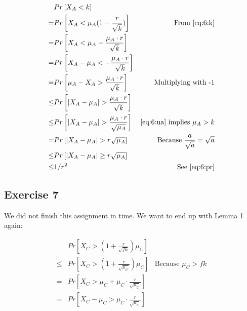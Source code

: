 \begin{align*}
	 & Pr\left[X_A < k\right] & \\
	=& Pr\left[X_A < \mu_A(1-\frac{r}{\sqrt{k}})\right] & \text{From \eqref{eq:6:k}} \\
	=& Pr\left[X_A < \mu_A - \frac{\mu_A \cdot r}{\sqrt{k}}\right] & \\
	=& Pr\left[X_A - \mu_A < -\frac{\mu_A \cdot r}{\sqrt{k}} \right] & \\
	=& Pr\left[\mu_A - X_A > \frac{\mu_A \cdot r}{\sqrt{k}} \right] & \text{Multiplying with -1} \\
	\leq & Pr\left[|X_A - \mu_A| > \frac{\mu_A \cdot r}{\sqrt{k}} \right] 
		& \\
	\leq & Pr\left[|X_A - \mu_A| > \frac{\mu_A \cdot r}{\sqrt{\mu_A}} \right]
		& \text{\eqref{eq:6:ua} implies $\mu_A > k$} \\
	=& Pr\left[|X_A - \mu_A| > r \sqrt{\mu_A} \right]
		& \text{Because $\frac{a}{\sqrt{a}} = \sqrt{a}$}\\
	\leq & Pr\left[|X_A - \mu_A| \geq r \sqrt{\mu_A} \right]
		& \\
	\leq & 1/r^2 & \text{See \eqref{eq:6:pr}}
\end{align*}

\subsection{Exercise 7}
We did not finish this assignment in time. We want to end up with Lemma 1 again:

\begin{align*}
	& Pr\left[ X_C > (1+\frac{r}{\sqrt{fk}}) \mu_C \right] & \\
	\leq & Pr\left[ X_C > (1+\frac{r}{\sqrt{\mu_C}}) \mu_C \right]
		& \text{Because $\mu_C > fk$} \\
	=& Pr\left[ X_C > \mu_C + \mu_C \cdot \frac{r}{\sqrt{\mu_C}} \right]
		& \\
	=& Pr\left[ X_C - \mu_C > \mu_C \cdot \frac{r}{\sqrt{\mu_C}} \right]
		&
\end{align*}